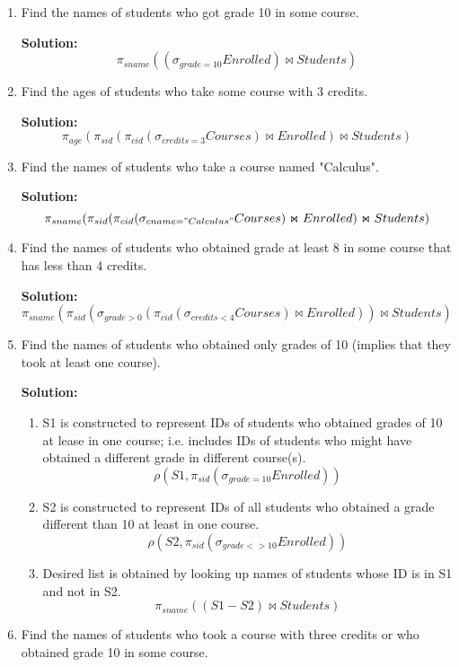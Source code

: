 \begin{enumerate}
  \item Find the names of students who got grade 10 in some course.
  
  \textbf{Solution:}
  $$\displaystyle \pi_{sname}((\sigma_{grade=10}Enrolled)\Join Students)$$
  \item Find the ages of students who take some course with 3 credits.
  
  \textbf{Solution:}
  $$\displaystyle \pi_{age} (\pi_{sid} (\pi_{cid} (\sigma_{credits=3}Courses) \Join Enrolled) \Join Students)$$
  \item Find the names of students who take a course named "Calculus".
  
  \textbf{Solution:}
  $$\displaystyle \pi_{sname} (\pi_{sid} (\pi_{cid} (\sigma_{cname="Calculus"}Courses) \Join Enrolled)\Join Students)$$
  \item Find the names of students who obtained grade at least 8 in some course that has less than 4 credits.
  
  \textbf{Solution:}
  $$\displaystyle \pi_{sname} (\pi_{sid} (\sigma_{grade>0}(\pi_{cid} (\sigma_{credits<4}Courses) \Join Enrolled)) \Join Students) $$
  
  \item Find the names of students who obtained only grades of 10 (implies that they took at least one course).
  
  \textbf{Solution:}
  \begin{enumerate}
  \item S1 is constructed to represent IDs of students who obtained grades of 10 at lease in one course; i.e. includes IDs of students who might have obtained a different grade in different course(s).
  $$\displaystyle \rho(S1, \pi_{sid}( \sigma_{grade=10}Enrolled)) $$
  \item S2 is constructed to represent IDs of all students who obtained a grade different than 10 at least in one course.
  $$\displaystyle \rho(S2, \pi_{sid}(\sigma_{grade<>10}Enrolled)) $$
  \item Desired list is obtained by looking up names of students whose ID is in S1 and not in S2.
  $$\displaystyle \pi_{sname}((S1-S2) \Join Students) $$
  \end{enumerate}
  
  \item Find the names of  students who took a course with three credits or who obtained grade 10 in some course.
  

\end{enumerate}
